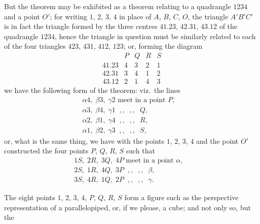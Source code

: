 \documentclass[11pt]{article}
\begin{document}
But the theorem may be exhibited as a theorem relating to a quadrangle $1234$ and a point $O'$; for writing $1$, $2$, $3$, $4$ in place of $A$, $B$, $C$, $O$, the triangle $A'B'C'$ is in fact the triangle formed by the three centres $41.23$, $42.31$, $43.12$ of the quadrangle $1234$, hence the triangle in question must be similarly related to each of the four triangles $423$, $431$, $412$, $123$; or, forming the diagram
\[
\begin{array}{c|cccc}
 & P & Q & R & S \\\hline
41.23 & 4 & 3 & 2 & 1 \\
42.31 & 3 & 4 & 1 & 2 \\
43.12 & 2 & 1 & 4 & 3
\end{array}
\]
we have the following form of the theorem: viz.\ the lines
\begin{align*}
\alpha 4,\; \beta 3,\; \gamma 2 \text{ meet in a point } P,&\\
\alpha 3,\; \beta 4,\; \gamma 1 \;\;,,\;\; ,, \;\; Q,&\\
\alpha 2,\; \beta 1,\; \gamma 4 \;\;,,\;\; ,, \;\; R,&\\
\alpha 1,\; \beta 2,\; \gamma 3 \;\;,,\;\; ,, \;\; S,&
\end{align*}
or, what is the same thing, we have with the points $1$, $2$, $3$, $4$ and the point $O'$ constructed the four points $P$, $Q$, $R$, $S$ such that
\begin{align*}
1S,\; 2R,\; 3Q,\; 4P \text{ meet in a point } \alpha,&\\
2S,\; 1R,\; 4Q,\; 3P \;\;,,\;\; ,, \;\; \beta,&\\
3S,\; 4R,\; 1Q,\; 2P \;\;,,\;\; ,, \;\; \gamma.&
\end{align*}

The eight points $1$, $2$, $3$, $4$, $P$, $Q$, $R$, $S$ form a figure such as the perspective representation of a parallelopiped, or, if we please, a cube; and not only so, but the

\medskip
\begin{center}
\end{center}
\end{document}
